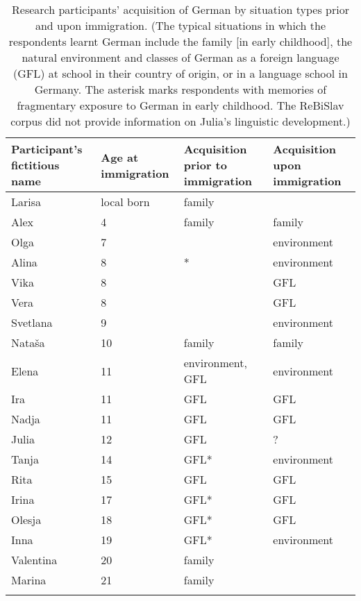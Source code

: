 \vfill
\begin{table}[H]
\begin{small}
		\begin{tabular}{p{7em}<{\raggedright}p{7em}<{\raggedright}p{7.5em}<{\raggedright}p{7em}<{\raggedright}} 
		\lsptoprule
        Participant's fictitious name & Age at immigration & Acquisition prior to immigration & Acquisition upon immigration \\\midrule
		Larisa & local born & family & \\
		Alex & 4 & family & family\\
		Olga & 7 & & environment\\
		Alina & 8 & * & environment\\
		Vika & 8 & & GFL\\
		Vera & 8 & & GFL\\	
		Svetlana & 9 & & environment\\
		Nataša & 10 & family & family\\
		Elena & 11 & environment, GFL & environment\\
		Ira & 11 & GFL & GFL \\
		Nadja & 11 & GFL & GFL \\
		Julia & 12 & GFL & ?\\
		Tanja & 14 & GFL* & environment\\
		Rita & 15 & GFL & GFL\\
		Irina & 17 & GFL* & GFL\\
		Olesja & 18 & GFL* & GFL\\
		Inna & 19 & GFL* & environment\\
		Valentina & 20 & family & \\
		Marina & 21 & family & \\
		\lspbottomrule
	\end{tabular}
\end{small}
	\caption{Research participants' acquisition of German by situation types prior and upon immigration. (The typical situations in which the respondents learnt German include the family [in early childhood], the natural environment and classes of German as a foreign language (GFL) at school in their country of origin, or in a language school in Germany. The asterisk marks respondents with memories of fragmentary exposure to German in early childhood. The ReBiSlav corpus did not provide information on Julia's linguistic development.)\label{tab:3:4}}
\end{table}
\vfill\pagebreak


